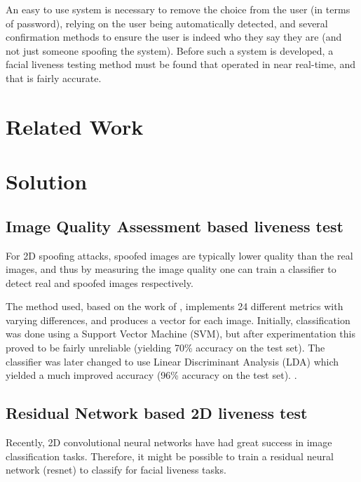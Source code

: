 \documentclass[10pt,a4paper]{article}
\begin{document}
    An easy to use system is necessary to remove the choice from the user (in terms of password), relying on the user being automatically
    detected, and several confirmation methods to ensure the user is indeed who they say they are (and not just someone spoofing the system).
    Before such a system is developed, a facial liveness testing method must be found that operated in near real-time, and that is fairly accurate.


\section{Related Work}
\section{Solution}
    \subsection{Image Quality Assessment based liveness test}
        For 2D spoofing attacks, spoofed images are typically lower quality than the real images, and thus by measuring the image quality
        one can train a classifier to detect real and spoofed images respectively.

        The method used, based on the work of \citet{ImageQualityAssessmentTest}, implements 24 different metrics with varying differences, and produces
        a vector for each image. Initially, classification was done using a Support Vector Machine (SVM), but after experimentation this proved to be fairly
        unreliable (yielding 70\% accuracy on the test set). The classifier was later changed to use Linear Discriminant Analysis (LDA) which yielded a much improved
        accuracy (96\% accuracy on the test set). .

    \subsection{Residual Network based 2D liveness test}
        Recently, 2D convolutional neural networks have had great success in image classification tasks. Therefore, it might be possible to train
        a residual neural network (resnet) to classify for facial liveness tasks.
\end{document}
